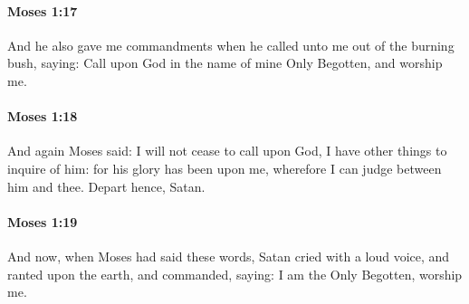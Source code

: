 		\paragraph{Moses 1:17} %
			\label{MOSES-1-17}

			And he also gave me commandments when he called unto me out of the burning bush, saying: Call upon God in the name of mine Only Begotten, and worship me.


		\paragraph{Moses 1:18} %
			\label{MOSES-1-18}

			And again Moses said: I will not cease to call upon God, I have other things to inquire of him: for his glory has been upon me, wherefore I can judge between him and thee. Depart hence, Satan.


		\paragraph{Moses 1:19} %
			\label{MOSES-1-19}

			And now, when Moses had said these words, Satan cried with a loud voice, and ranted upon the earth, and commanded, saying: I am the Only Begotten, worship me.


